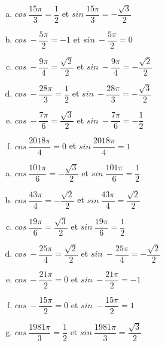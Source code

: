\documentclass[12pt]{book}
\begin{document}
\begin{Exercise}
    \begin{enumerate}[a)]
        \item $cos{\ \dfrac{15\pi}{3}}=\dfrac{1}{2}$ \quad et \quad $sin{\ \dfrac{15\pi}{3}}=-\dfrac{\sqrt{3}}{2}$
        \item $cos{\ -\dfrac{5\pi}{2}}=-1$ \quad et \quad $sin{\ -\dfrac{5\pi}{2}}=0$
        \item $cos{\ -\dfrac{9\pi}{4}}=\dfrac{\sqrt{2}}{2}$ \quad et \quad $sin{\ -\dfrac{9\pi}{4}}=-\dfrac{\sqrt{2}}{2}$
        \item $cos{\ -\dfrac{28\pi}{3}}=\dfrac{1}{2}$ \quad et \quad $sin{\ -\dfrac{28\pi}{3}}=-\dfrac{\sqrt{3}}{2}$
        \item $cos{\ -\dfrac{7\pi}{6}}=\dfrac{\sqrt{3}}{2}$ \quad et \quad $sin{\ -\dfrac{7\pi}{6}}=-\dfrac{1}{2}$
        \item $cos{\ \dfrac{2018\pi}{4}}=0$ \quad et \quad $sin{\ \dfrac{2018\pi}{4}}=1$
    \end{enumerate}
\end{Exercise}

\begin{Exercise}[number={65}]
    \begin{enumerate}[a)]
        \item $cos{\ \dfrac{101\pi}{6}}=-\dfrac{\sqrt{3}}{2}$ \quad et \quad $sin{\ \dfrac{101\pi}{6}}=\dfrac{1}{2}$
        \item $cos{\ \dfrac{43\pi}{4}}=-\dfrac{\sqrt{2}}{2}$ \quad et \quad $sin{\ \dfrac{43\pi}{4}}=\dfrac{\sqrt{2}}{2}$
        \item $cos{\ \dfrac{19\pi}{6}}=\dfrac{\sqrt{3}}{2}$ \quad et \quad $sin{\ \dfrac{19\pi}{6}}=\dfrac{1}{2}$
        \item $cos{\ -\dfrac{25\pi}{4}}=\dfrac{\sqrt{2}}{2}$ \quad et \quad $sin{\ -\dfrac{25\pi}{4}}=-\dfrac{\sqrt{2}}{2}$
        \item $cos{\ -\dfrac{21\pi}{2}}=0$ \quad et \quad $sin{\ -\dfrac{21\pi}{2}}=-1$
        \item $cos{\ -\dfrac{15\pi}{2}}=0$ \quad et \quad $sin{\ -\dfrac{15\pi}{2}}=1$
        \item $cos{\ \dfrac{1981\pi}{3}}=\dfrac{1}{2}$ \quad et \quad $sin{\ \dfrac{1981\pi}{3}}=\dfrac{\sqrt{3}}{2}$
    \end{enumerate}
\end{Exercise}

\pagebreak %
\end{document}
